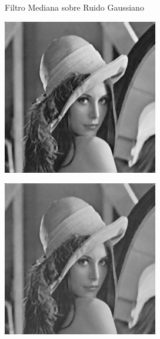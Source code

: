 \documentclass{beamer}
\begin{document}
\begin{frame}[fragile]{Filtro Mediana sobre Ruido Gaussiano}
	\begin{minipage}{0.25\linewidth}
		\centering
		\includegraphics[width=\linewidth]{../results/lena_gauss_sigma10_mediana}
	\end{minipage}\hfill
	\begin{minipage}{0.25\linewidth}
		\centering
		\includegraphics[width=\linewidth]{../results/lena_gauss_sigma20_mediana}

\end{minipage}
\end{frame}
\end{document}
